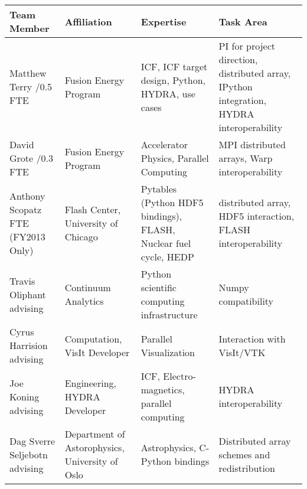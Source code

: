 \documentclass[letterpaper,11pt]{article}
\newlength{\DUtablewidth} %
\begin{document}
\setlength{\DUtablewidth}{\linewidth}
\begin{longtable*}[c]
	{|p{0.187\DUtablewidth}|p{0.251\DUtablewidth}|p{0.260\DUtablewidth}|p{0.251\DUtablewidth}|}
	\hline
	\textbf{Team Member} & \textbf{Affiliation} & \textbf{Expertise} & \textbf{Task Area} \\
	\endfirsthead
	\hline

	Matthew Terry /0.5 FTE &
	Fusion Energy Program &
	ICF, ICF target design, Python, HYDRA, use cases &
	PI for project direction,
	distributed array, IPython integration, HYDRA interoperability \\
	\hline

	David Grote /0.3 FTE &
	Fusion Energy Program &
	Accelerator Physics, Parallel Computing &
	MPI distributed arrays, Warp interoperability \\
	\hline

	Anthony Scopatz  FTE (FY2013 Only) &
	Flash Center, \newline
	University of Chicago &
	Pytables (Python HDF5 bindings), FLASH, Nuclear fuel cycle, HEDP &
	distributed array, HDF5 interaction, FLASH interoperability \\
	\hline

	Travis Oliphant \newline
	advising &
	Continuum Analytics &
	Python scientific computing infrastructure &
	Numpy compatibility \\
	\hline

	Cyrus Harrision \newline
	advising &
	Computation, \newline
	VisIt Developer &
	Parallel Visualization &
	Interaction with VisIt/VTK  \\
	\hline

	Joe Koning \newline
	advising &
	Engineering, \newline
	HYDRA Developer & 
	ICF, Electro-magnetics, parallel computing & 
	HYDRA interoperability \\
	\hline

	Dag Sverre Seljebotn \newline
	advising &
	Department of Astorophysics, \newline
	University of Oslo &
	Astrophysics, C-Python bindings &
	Distributed array schemes and redistribution \\
	\hline
\end{longtable*}



\end{document}
